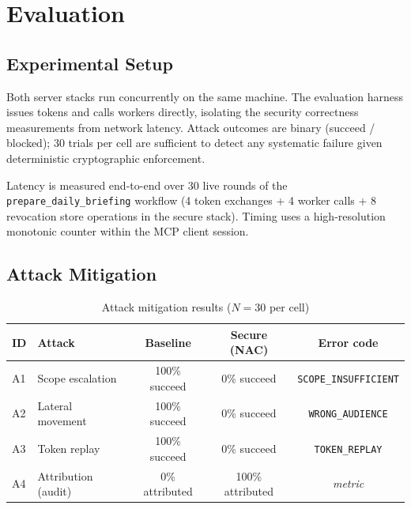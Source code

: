 \documentclass[journal]{IEEEtran}
\begin{document}
\section{Evaluation}
\label{sec:eval}

\subsection{Experimental Setup}

Both server stacks run concurrently on the same machine.
The evaluation harness issues tokens and calls workers directly,
isolating the security correctness measurements from network latency.
Attack outcomes are binary (succeed / blocked); 30 trials per cell are
sufficient to detect any systematic failure given deterministic cryptographic
enforcement.

Latency is measured end-to-end over 30 live rounds of the
\texttt{prepare\_daily\_briefing} workflow (4 token exchanges + 4 worker calls +
8 revocation store operations in the secure stack). Timing uses a
high-resolution monotonic counter within the MCP client session.

\subsection{Attack Mitigation}

\begin{table}[h]
\caption{Attack mitigation results ($N = 30$ per cell)}
\label{tab:attacks}
\centering
\footnotesize
\setlength{\tabcolsep}{4pt}
\begin{tabular}{llccc}
\toprule
\textbf{ID} & \textbf{Attack} & \textbf{Baseline} & \textbf{Secure (NAC)} & \textbf{Error code} \\
\midrule
A1 & Scope escalation    & 100\% succeed & 0\% succeed & \texttt{SCOPE\_INSUFFICIENT} \\
A2 & Lateral movement    & 100\% succeed & 0\% succeed & \texttt{WRONG\_AUDIENCE} \\
A3 & Token replay        & 100\% succeed & 0\% succeed & \texttt{TOKEN\_REPLAY} \\
A4 & Attribution (audit) & 0\% attributed & 100\% attributed & \textit{metric} \\
\bottomrule
\end{tabular}
\end{table}
\end{document}
